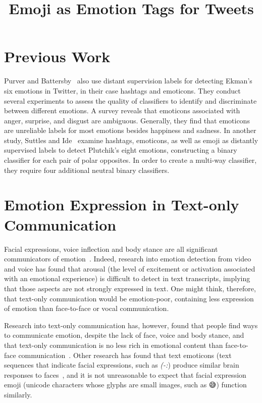 \documentclass[10pt, a4paper]{article}
\title{Emoji as Emotion Tags for Tweets}
\begin{document}
\maketitleabstract

\section{Previous Work} 
Purver and Battersby~ also use distant supervision labels for detecting Ekman’s six emotions in Twitter, in their case hashtags and emoticons. They conduct several experiments to assess the quality of classifiers to identify and discriminate between different emotions. A survey reveals that emoticons associated with anger, surprise, and disgust are ambiguous. Generally, they find that emoticons are unreliable labels for most emotions besides happiness and sadness. In another study, Suttles and Ide~ examine hashtags, emoticons, as well as emoji as distantly supervised labels to detect Plutchik’s eight emotions, constructing a binary classifier for each pair of polar opposites. In order to create a multi-way classifier, they require four additional neutral binary classifiers. 

\section{Emotion Expression in Text-only Communication}
\label{sec:emotion_expression_in_text_only_communication}
Facial expressions, voice inflection and body stance are all significant communicators of emotion~\cite{Johnston2015Apa}. 
Indeed, research into emotion detection from video and voice has found that arousal (the level of excitement or activation associated with an emotional experience) is 
difficult to detect in text transcripts, implying that those aspects are not strongly expressed in text.
One might think, therefore, that text-only communication would be emotion-poor, containing less expression of emotion than face-to-face or vocal communication.

Research into text-only communication has, however, found that people find ways to communicate emotion, despite the lack of face, voice and body stance, and that text-only communication is no less rich in emotional content than face-to-face communication~\cite{Derks2008Role}.
Other research has found that text emoticons (text sequences that indicate facial expressions, such as \emph{(-:}) produce similar brain responses to faces~\cite{Churches2014Emoticons}, and it is not unreasonable to expect that facial expression emoji (unicode characters whose glyphs are small images, such as 😅) function similarly.
\end{document}
